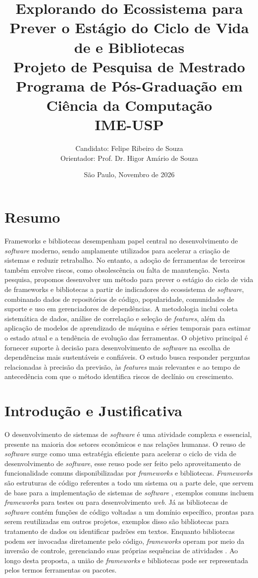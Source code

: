 \documentclass[11pt,a4paper]{article}
\title{\textbf{Explorando \en{Features} do Ecossistema para Prever o Estágio do Ciclo de Vida de \en{Frameworks} e Bibliotecas}\\[1em]
\large Projeto de Pesquisa de Mestrado \\
\large Programa de Pós-Graduação em Ciência da Computação \\
\large IME-USP}
\author{Candidato: Felipe Ribeiro de Souza \\
Orientador: Prof. Dr. Higor Amário de Souza}
\date{São Paulo, Novembro de 2026}
\newcommand{\en}[1]{\textit{#1}}
\begin{document}
\maketitle

\section{Resumo}
Frameworks e bibliotecas desempenham papel central no desenvolvimento de \en{software} moderno, sendo amplamente utilizados para acelerar a criação de sistemas e reduzir retrabalho. No entanto, a adoção de ferramentas de terceiros também envolve riscos, como obsolescência ou falta de manutenção. Nesta pesquisa, propomos desenvolver um método para prever o estágio do ciclo de vida de frameworks e bibliotecas a partir de indicadores do ecossistema de \en{software}, combinando dados de repositórios de código, popularidade, comunidades de suporte e uso em gerenciadores de dependências. A metodologia inclui coleta sistemática de dados, análise de correlação e seleção de \en{features}, além da aplicação de modelos de aprendizado de máquina e séries temporais para estimar o estado atual e a tendência de evolução das ferramentas. O objetivo principal é fornecer suporte à decisão para desenvolvimento de \en{software} na escolha de dependências mais sustentáveis e confiáveis. O estudo busca responder perguntas relacionadas à precisão da previsão, às \en{features} mais relevantes e ao tempo de antecedência com que o método identifica riscos de declínio ou crescimento.

\section{Introdução e Justificativa}
O desenvolvimento de sistemas de \en{software} é uma atividade complexa e essencial, presente na maioria dos setores econômicos e nas relações humanas. O reuso de \en{software} surge como uma estratégia eficiente para acelerar o ciclo de vida de desenvolvimento de \en{software}, esse reuso pode ser feito pelo aproveitamento de funcionalidade comuns disponibilizadas por \en{frameworks} e bibliotecas. \en{Frameworks} são estruturas de código referentes a todo um sistema ou a parte dele, que servem de base para a implementação de sistemas de \en{software} \cite{johnson1997}, exemplos comuns incluem \en{frameworks} para testes ou para desenvolvimento \en{web}. Já as bibliotecas de \en{software} contém funções de código voltadas a um domínio específico, prontas para serem reutilizadas em outros projetos, exemplos disso são bibliotecas para tratamento de dados ou identificar padrões em textos. Enquanto bibliotecas podem ser invocadas diretamente pelo código, \en{frameworks} operam por meio da inversão de controle, gerenciando suas próprias sequências de atividades \cite{johnson1988}. Ao longo desta proposta, a união de \en{frameworks} e bibliotecas pode ser representada pelos termos ferramentas ou pacotes.
\end{document}
